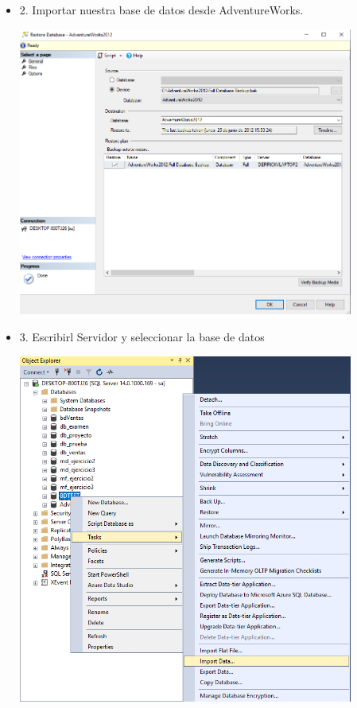 \begin{itemize}
 \item 2. Importar nuestra base de datos desde AdventureWorks.\\
	\begin{center}
	\includegraphics[width=11cm]{./Imagenes/imagen2}
	\end{center}	
\pagebreak
 \item 3. Escribirl Servidor y seleccionar la base de datos\\
	\begin{center}
	\includegraphics[width=11cm]{./Imagenes/imagen3}
	\end{center}	


\end{itemize}
